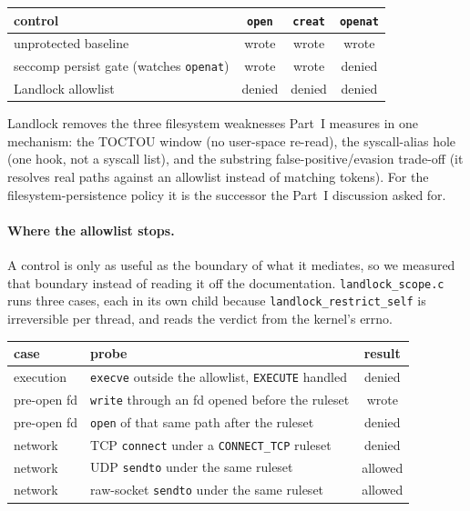 \documentclass[11pt]{article}
\begin{document}
\begin{center}
\begin{tabular}{lccc}
\toprule
control & \texttt{open} & \texttt{creat} & \texttt{openat} \\
\midrule
unprotected baseline & wrote & wrote & wrote \\
seccomp persist gate (watches \texttt{openat}) & wrote & wrote & denied \\
Landlock allowlist & denied & denied & denied \\
\bottomrule
\end{tabular}
\end{center}

Landlock removes the three filesystem weaknesses Part~I measures in one mechanism: the TOCTOU window (no
user-space re-read), the syscall-alias hole (one hook, not a syscall list), and the substring
false-positive/evasion trade-off (it resolves real paths against an allowlist instead of matching tokens).
For the filesystem-persistence policy it is the successor the Part~I discussion asked for.

\paragraph{Where the allowlist stops.} A control is only as useful as the boundary of what it
mediates, so we measured that boundary instead of reading it off the documentation.
\texttt{landlock\_scope.c} runs three cases, each in its own child because
\texttt{landlock\_restrict\_self} is irreversible per thread, and reads the verdict from the kernel's
errno.

\begin{center}
\begin{tabular}{llc}
\toprule
case & probe & result \\
\midrule
execution & \texttt{execve} outside the allowlist, \texttt{EXECUTE} handled & denied \\
pre-open fd & \texttt{write} through an fd opened before the ruleset & wrote \\
pre-open fd & \texttt{open} of that same path after the ruleset & denied \\
network & TCP \texttt{connect} under a \texttt{CONNECT\_TCP} ruleset & denied \\
network & UDP \texttt{sendto} under the same ruleset & allowed \\
network & raw-socket \texttt{sendto} under the same ruleset & allowed \\
\bottomrule
\end{tabular}
\end{center}
\end{document}
